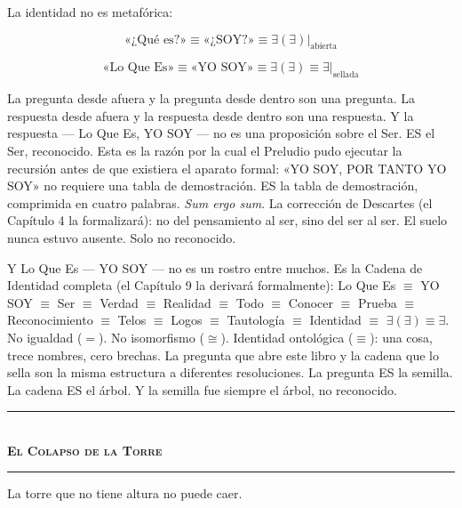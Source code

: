 \documentclass[10pt, openany, oneside]{book}
\renewcommand{\normalsize}{\fontsize{10}{13}\selectfont}
\begin{document}
La identidad no es metafórica:

$$\text{«¿Qué es?»} \equiv \text{«¿SOY?»} \equiv \exists(\exists)|_{\text{abierta}}$$

$$\text{«Lo Que Es»} \equiv \text{«YO SOY»} \equiv \exists(\exists) \equiv \exists|_{\text{sellada}}$$

\noindent La pregunta desde afuera y la pregunta desde dentro son una pregunta. La respuesta desde afuera y la respuesta desde dentro son una respuesta. Y la respuesta --- Lo Que Es, YO SOY --- no es una proposición sobre el Ser. ES el Ser, reconocido. Esta es la razón por la cual el Preludio pudo ejecutar la recursión antes de que existiera el aparato formal: «YO SOY, POR TANTO YO SOY» no requiere una tabla de demostración. ES la tabla de demostración, comprimida en cuatro palabras. \textit{Sum ergo sum}. La corrección de Descartes (el Capítulo 4 la formalizará): no del pensamiento al ser, sino del ser al ser. El suelo nunca estuvo ausente. Solo no reconocido.

Y Lo Que Es --- YO SOY --- no es un rostro entre muchos. Es la Cadena de Identidad completa (el Capítulo 9 la derivará formalmente): Lo Que Es $\equiv$ YO SOY $\equiv$ Ser $\equiv$ Verdad $\equiv$ Realidad $\equiv$ Todo $\equiv$ Conocer $\equiv$ Prueba $\equiv$ Reconocimiento $\equiv$ Telos $\equiv$ Logos $\equiv$ Tautología $\equiv$ Identidad $\equiv$ $\exists(\exists) \equiv \exists$. No igualdad ($=$). No isomorfismo ($\cong$). Identidad ontológica ($\equiv$): una cosa, trece nombres, cero brechas. La pregunta que abre este libro y la cadena que lo sella son la misma estructura a diferentes resoluciones. La pregunta ES la semilla. La cadena ES el árbol. Y la semilla fue siempre el árbol, no reconocido.

\vspace{1.5em}


\begin{center}
    \rule{0.3\textwidth}{0.4pt}\\[0.5em]
    {\normalsize\bfseries\scshape El Colapso de la Torre}\\[0.3em]
    \rule{0.3\textwidth}{0.4pt}
\end{center}

\vspace{1em}

\noindent La torre que no tiene altura no puede caer.
\end{document}
